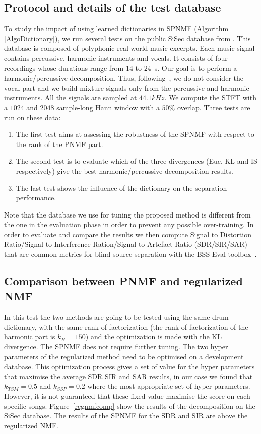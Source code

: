 \subsection{Protocol and details of the test database}


To study the impact of using learned dictionaries in SPNMF (Algorithm \ref{AlgoDictionary}), we run several tests on the public SiSec database from \cite{SiSec10}. This database is composed of polyphonic real-world music excerpts. Each music signal contains percussive, harmonic instruments and vocals. It consists of four recordings whose durations range from $14$ to $24$~s. Our goal is to perform a harmonic/percussive decomposition. Thus, following~\cite{canadas2014percussive}, we do not consider the vocal part and we build mixture signals only from the percussive and harmonic instruments. All the signals are sampled at $44.1kHz$. We compute the STFT with a $1024$ and $2048$ sample-long Hann window with a $50\%$ overlap.
Three tests are run on these data:
\begin{enumerate}
	\item The first test aims at assessing the robustness of the SPNMF with respect to the rank of the PNMF part. 
	\item The second test is to evaluate which of the three divergences (Euc, KL and IS respectively) give the best harmonic/percussive decomposition results.
	\item The last test shows the influence of the dictionary on the separation performance. 
\end{enumerate} 
Note that the database we use for tuning the proposed method is different from the one in the evaluation phase in order to prevent any possible over-training. 
In order to evaluate and compare the results we then compute Signal to Distortion Ratio/Signal to Interference Ration/Signal to Artefact Ratio (SDR/SIR/SAR) that are common metrics for blind source separation with the BSS-Eval toolbox~\cite{bsseval}. 



\subsection{Comparison between PNMF and regularized NMF}

In this test the two methods are going to be tested using the same drum dictionary, with the same rank of factorization (the rank of factorization of the harmonic part is $k_H=150$) and the optimization is made with the KL divergence.
The SPNMF does not require further tuning. The two hyper parameters of the regularized method need to be optimised on a development database. This optimization process gives a set of value for the hyper parameters that maximise the average SDR SIR and SAR results, in our case we found that $k_{TSM} = 0.5$ and $k_{SSP}= 0.2$ where the most appropriate set of hyper parameters. However, it is not guaranteed that these fixed value maximise the score on each specific songs. 
Figure~\ref{regnmfcomp} show the results of the decomposition on the SiSec database. The results of the SPNMF for the SDR and SIR are above the regularized NMF.

